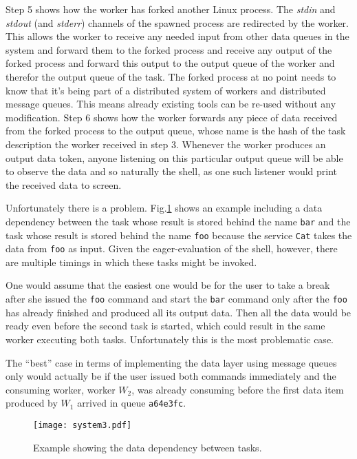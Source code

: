 Step 5 shows how the worker has forked another Linux process.
The \textit{stdin} and \textit{stdout} (and \textit{stderr})
channels of the spawned process are redirected by the worker.
This allows the worker to receive any needed input from other
data queues in the system and forward them to the forked process
and receive any output of the forked process and forward this
output to the output queue of the worker and therefor the output
queue of the task. The forked process at no point needs to know
that it's being part of a distributed system of workers and
distributed message queues. This means already existing tools
can be re-used without any modification.
Step 6 shows how the worker forwards any piece of data
received from the forked process to the output queue, whose
name is the hash of the task description the worker received
in step 3. Whenever the worker produces an output data token,
anyone listening on this particular output queue will be able
to observe the data and so naturally the shell, as one such
listener would print the received data to screen.
\newline

Unfortunately there is a problem. Fig.\ref{system3} shows an
example including a data dependency between the task whose
result is stored behind the name \texttt{bar} and the task
whose result is stored behind the name \texttt{foo} because
the service \texttt{Cat} takes the data from \texttt{foo}
as input. Given the eager-evaluation of the shell, however,
there are multiple timings in which these
tasks might be invoked.

One would assume that the easiest one would be for the user
to take a break after she issued the \texttt{foo} command and
start the \texttt{bar} command only after the \texttt{foo}
has already finished and produced all its output data.
Then all the data would be ready even before the second task
is started, which could result in the same worker executing
both tasks. Unfortunately this is the most problematic case.

The ``best'' case in terms of implementing the data layer
using message queues only would actually be if the user
issued both commands immediately and the consuming worker,
worker $W_{2}$, was already consuming before the first data
item produced by $W_{1}$ arrived in queue \texttt{a64e3fc}.

\begin{figure}[h]
  \texttt{[image: system3.pdf]}
  \caption{Example showing the data dependency between tasks.}
  \label{system3}
\end{figure}

